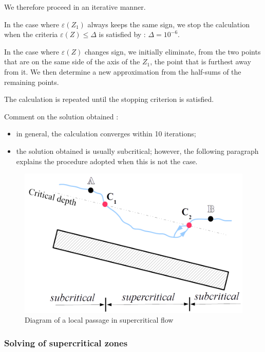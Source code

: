 We therefore proceed in an iterative manner.

In the case where $\varepsilon(Z_1)$ always keeps the same sign, we stop the calculation when the criteria  $\varepsilon(Z) \leq \Delta$ is satisfied by : $\Delta = 10^{-6}$.

In the case where $\varepsilon(Z)$ changes sign, we initially eliminate, from the two points that are on the same side of the axis of the $Z_1$, the point that is furthest away from it.  We then determine a new approximation from the half-sums of the remaining points.

The calculation is repeated until the stopping criterion is satisfied.

Comment on the solution obtained :
\begin{itemize}
 \item in general, the calculation converges within 10 iterations;
 \item the solution obtained is usually subcritical; however, the following paragraph explains the procedure adopted when this is not the case.
\end{itemize}

\begin{figure}[H]
 \begin{center}
  \includegraphics[width=\textwidth]{Figures/Pass_Loc_Tor.png}
  \caption{Diagram of a local passage in supercritical flow}
  \label{fig:PLT}
 \end{center}
\end{figure}


\subsubsection{Solving of supercritical zones}

